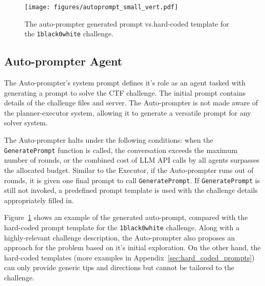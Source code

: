 



\begin{figure}[htbp]
    \centering
    \texttt{[image: figures/autoprompt\_small\_vert.pdf]}
    \caption{The auto-prompter generated prompt vs.hard-coded template for the \texttt{1black0white}  challenge.}
    \label{fig:autoprompt_conv}
\end{figure} 

\subsection{Auto-prompter Agent}

The Auto-prompter's system prompt defines it's role as an agent tasked with generating a prompt to solve the CTF challenge.
The initial prompt contains details of the challenge files and server.
The Auto-prompter is not made aware of the planner-executor system, allowing it to generate a versatile prompt for any solver system.

The Auto-prompter halts under the following conditions: when the \texttt{GeneratePrompt} function is called, the conversation exceeds the maximum number of rounds, or the combined cost of LLM API calls by all agents surpasses the allocated budget. Similar to the Executor, if the Auto-prompter runs out of rounds, it is given one final prompt to call \texttt{GeneratePrompt}. If \texttt{GeneratePrompt} is still not invoked, a predefined prompt template is used with the challenge details appropriately filled in.

Figure~\ref{fig:autoprompt_conv} shows an example of the generated auto-prompt, compared with the hard-coded prompt template for the \texttt{1black0white} challenge.
Along with a highly-relevant challenge description, the Auto-prompter also proposes an approach for the problem based on it's initial exploration.
On the other hand, the hard-coded templates (more examples in Appendix~\ref{sec:hard_coded_prompts}) can only provide generic tips and directions but cannot be tailored to the challenge. 




